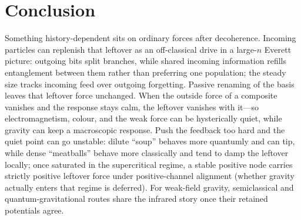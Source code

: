 \documentclass[11pt]{article}
\theoremstyle{remark}
\begin{document}
\section{Conclusion}
Something history-dependent sits on ordinary forces after decoherence.
Incoming particles can replenish that leftover as an off-classical drive in a large-$n$ Everett picture: outgoing bits split branches, while shared incoming information refills entanglement between them rather than preferring one population; the steady size tracks incoming feed over outgoing forgetting.
Passive renaming of the basis leaves that leftover force unchanged.
When the outside force of a composite vanishes and the response stays calm, the leftover vanishes with it---so electromagnetism, colour, and the weak force can be hysterically quiet, while gravity can keep a macroscopic response.
Push the feedback too hard and the quiet point can go unstable: dilute ``soup'' behaves more quantumly and can tip, while dense ``meatballs'' behave more classically and tend to damp the leftover locally; once saturated in the supercritical regime, a stable positive node carries strictly positive leftover force under positive-channel alignment (whether gravity actually enters that regime is deferred).
For weak-field gravity, semiclassical and quantum-gravitational routes share the infrared story once their retained potentials agree.
\end{document}

